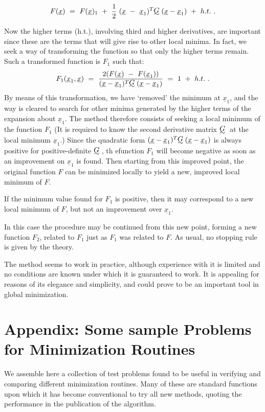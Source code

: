 $$F({\underline{x}})~=~F({\underline{x}})_1~+~{1\over
2}~({\underline{x}}~-~{\underline{x}}_1)
^T\UTG({\underline{x}}-{\underline{x}}_1)~+~h.t.~.$$
 
Now the higher terms (h.t.), involving third and higher derivatives, are
important since these are the terms that will give rise to other local
minima.  In fact, we seek a way of transforming the function so that only
the higher terms remain.  Such a transformed function is $F_1$ such that:
$$F_1({\underline{x}}_1,{\underline{x}})~=~{2(F({\underline{x}})~-~F({\underline{x}}_1))\over
({\underline{x}}-{\underline{x}}_1)^T\UTG({\underline{x}}-{\underline{x}}_1)}~=~1~+~h.t.~.$$
 By means of this
transformation, we have `removed' the minimum at ${\underline{x}}_1$, and 
the way is cleared to search for other
minima generated by the higher terms of the expansion about ${\underline{x}}_1$.
  The method therefore consists of
seeking a local minimum of the function $F_1$  (It is required to know the
second derivative matrix $\UTG$ at the local minimum ${\underline{x}}_1$.)  Since the
quadratic form $({\underline{x}} - {\underline{x}}_1)^T \UTG({\underline{x}} -
{\underline{x}}_1)$
 is always positive for positive-definite $\UTG$, th
efunction $F_1$ will become negative as soon as an improvement on ${\underline{x}}_1$ is
found.  Then starting from this improved point, the original function $F$
can be minimized locally to yield a new, improved local minimum of $F$.
 
     If the minimum value found for $F_1$ is positive, 
then it may correspond to a new local minimum
of $F$, but not an improvement over ${\underline{x}}_1$.
 
In this case the procedure may be continued from this new point, forming
a new function $F_2$, related to $F_1$ just as $F_1$ was related to $F$. As usual,
no stopping rule is given by the theory.
 
     The method seems to work in practice, although experience with it
is limited and no conditions are known under which it is guaranteed to
work.  It is appealing for reasons of its elegance and simplicity, and
could prove to be an important tool in global minimization.
\newpage
\chapter*{Appendix: Some sample Problems for Minimization Routines}
     We assemble here a collection of test problems  found to be
useful in verifying and comparing different minimization routines.
Many of these are standard functions upon which it has become
conventional to try all new methods, quoting the performance in the
publication of the algorithm.
 
